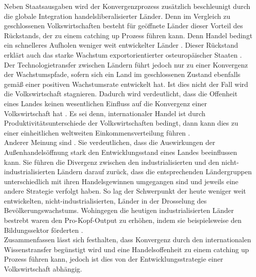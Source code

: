 Neben Staatsausgaben wird der Konvergenzprozess zus{\"a}tzlich beschleunigt durch die globale Integration handelsliberalisierter L{\"a}nder. Denn im Vergleich zu geschlossenen Volkswirtschaften  besteht f{\"u}r ge{\"o}ffnete L{\"a}nder dieser Vorteil des R{\"u}ckstands, der zu einem catching up Prozess f{\"u}hren kann. Denn Handel bedingt ein schnelleres Aufholen weniger weit entwickelter L{\"a}nder \citep{Sachs.1995}. Dieser R{\"u}ckstand erkl{\"a}rt auch das starke Wachstum exportorientierter osteurop{\"a}ischer Staaten \citep{Ventura.1997}.\\


Der Technologietransfer zwischen L{\"a}ndern f{\"u}hrt jedoch nur zu einer Konvergenz der Wachstumspfade, sofern sich ein Land im geschlossenen Zustand ebenfalls gem{\"a}{\ss} einer positiven Wachstumsrate entwickelt hat. Ist dies nicht der Fall wird die Volkswirtschaft stagnieren. Dadurch wird verdeutlicht, dass die Offenheit eines Landes keinen wesentlichen Einfluss auf die Konvergenz einer Volkswirtschaft hat \citep{Howitt.2000}. 
Es sei denn, internationaler Handel ist durch Produktivit{\"a}tsunterschiede der Volkswirtschaften bedingt, dann kann dies zu einer einheitlichen weltweiten Einkommensverteilung f{\"u}hren \citep{Howitt.2000,Acemoglu.2002,Eaton.2001}.\\
Anderer Meinung sind \citet{Galor.2006,Galor.2008}. Sie verdeutlichen, dass die Auswirkungen der Au{\ss}enhandels{\"o}ffnung stark den Entwicklungsstand eines Landes beeinflussen kann. Sie f{\"u}hren die Divergenz zwischen den industrialisierten und den nicht-industrialisierten L{\"a}ndern darauf zur{\"u}ck, dass die entsprechenden L{\"a}ndergruppen unterschiedlich mit ihren Handelsgewinnen umgegangen sind und jeweils eine andere Strategie verfolgt haben. So lag der Schwerpunkt der heute weniger weit entwickelten, nicht-industrialisierten, L{\"a}nder in der Drosselung des Bev{\"o}lkerungswachstums. Wohingegen die heutigen industrialisierten L{\"a}nder bestrebt waren den Pro-Kopf-Output zu erh{\"o}hen, indem sie beispielsweise den Bildungssektor f{\"o}rderten \cite{Galor.2006}.\\


Zusammenfassen l{\"a}sst sich festhalten, dass Konvergenz durch den internationalen Wissenstransfer beg{\"u}nstigt wird und eine Handelsoffenheit zu einem catching up Prozess f{\"u}hren kann, jedoch ist dies von der Entwicklungsstrategie einer Volkswirtschaft abh{\"a}ngig. 

